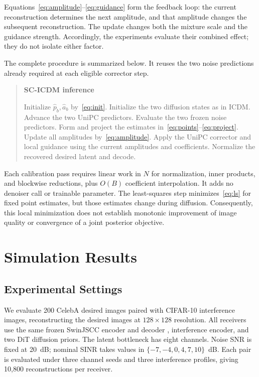 \documentclass[conference]{IEEEtran}
\begin{document}
Equations~\eqref{eq:amplitude}--\eqref{eq:guidance} form the feedback loop:
the current reconstruction determines the next amplitude, and that
amplitude changes the subsequent reconstruction. The update changes both
the mixture scale and the guidance strength. Accordingly, the experiments
evaluate their combined effect; they do not isolate either factor.

The complete procedure is summarized below. It reuses the two noise
predictions already required at each eligible corrector step.

\begin{quote}
\textbf{SC-ICDM inference}
\begin{algorithmic}[1]
\STATE Initialize $\widehat p_b,\widehat a_b$ by~\eqref{eq:init}.
\STATE Initialize the two diffusion states as in ICDM.
    \STATE Advance the two UniPC predictors.
        \STATE Evaluate the two frozen noise predictors.
            \STATE Form and project the estimates in~\eqref{eq:points}--\eqref{eq:project}.
            \STATE Update all amplitudes by~\eqref{eq:amplitude}.
        \ENDIF
        \STATE Apply the UniPC corrector and local guidance
        using the current amplitudes and coefficients.
    \ENDIF
\ENDFOR
\STATE Normalize the recovered desired latent and decode.
\end{algorithmic}
\end{quote}

Each calibration pass requires linear work in $N$ for normalization,
inner products, and blockwise reductions, plus $O(B)$ coefficient
interpolation. It adds no denoiser call or trainable parameter.
The least-squares step minimizes~\eqref{eq:ls} for fixed point estimates,
but those estimates change during diffusion. Consequently, this local
minimization does not establish monotonic improvement of image quality or
convergence of a joint posterior objective.

\section{Simulation Results}

\subsection{Experimental Settings}

We evaluate 200 CelebA desired images paired with CIFAR-10 interference
images, reconstructing the desired images at $128\times128$ resolution.
All receivers use the same frozen SwinJSCC encoder and decoder
\cite{yang2025swinjscc}, interference encoder, and two DiT diffusion priors.
The latent bottleneck has eight channels. Noise SNR is fixed at 20~dB;
nominal SINR takes values in $\{-7,-4,0,4,7,10\}$~dB.
Each pair is evaluated under three channel seeds and three interference
profiles, giving 10,800 reconstructions per receiver.
\end{document}
